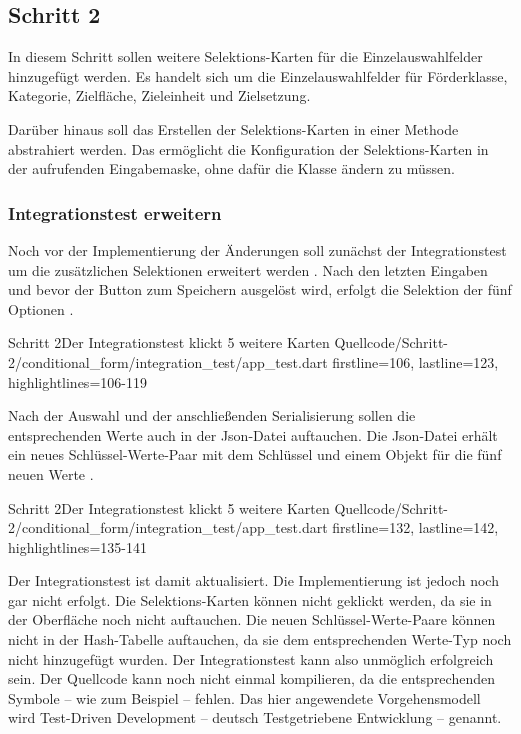 \clearpage 

\subsection{Schritt 2}

In diesem Schritt sollen weitere Selektions-Karten für die Einzelauswahlfelder hinzugefügt werden.
Es handelt sich um die Einzelauswahlfelder für Förderklasse, Kategorie, Zielfläche, Zieleinheit und Zielsetzung. 

Darüber hinaus soll das Erstellen der Selektions-Karten in einer Methode abstrahiert werden.
Das ermöglicht die Konfiguration der Selektions-Karten in der aufrufenden Eingabemaske, ohne dafür die Klasse  ändern zu müssen.

\subsubsection{Integrationstest erweitern}

Noch vor der Implementierung der Änderungen soll zunächst der Integrationstest um die zusätzlichen Selektionen erweitert werden \Lst{\ref{lst:Schritt2IntegrationstestKlickt5WeitereKarten}}. Nach den letzten Eingaben und bevor der Button zum Speichern ausgelöst wird, erfolgt die Selektion der fünf Optionen .   

\begin{alexlisting}{Schritt 2}{Der Integrationstest klickt 5 weitere Karten}
  {Quellcode/Schritt-2/conditional_form/integration_test/app_test.dart}
  {firstline=106, lastline=123, highlightlines={106-119}}
  \label{lst:Schritt2IntegrationstestKlickt5WeitereKarten}
\end{alexlisting}

Nach der Auswahl und der anschließenden Serialisierung sollen die entsprechenden Werte auch in der Json-Datei auftauchen.
Die Json-Datei erhält ein neues Schlüssel-Werte-Paar mit dem Schlüssel  und einem Objekt für die fünf neuen Werte .

\begin{alexlisting}{Schritt 2}{Der Integrationstest klickt 5 weitere Karten}
  {Quellcode/Schritt-2/conditional_form/integration_test/app_test.dart}
  {firstline=132, lastline=142, highlightlines={135-141}}
  \label{lst:Schritt2ExpectedJson}
\end{alexlisting}

Der Integrationstest ist damit aktualisiert.
Die Implementierung ist jedoch noch gar nicht erfolgt.
Die Selektions-Karten können nicht geklickt werden, da sie in der Oberfläche noch nicht auftauchen.
Die neuen Schlüssel-Werte-Paare können nicht in der Hash-Tabelle auftauchen, da sie dem entsprechenden Werte-Typ noch nicht hinzugefügt wurden.
Der Integrationstest kann also unmöglich erfolgreich sein.
Der Quellcode kann noch nicht einmal kompilieren, da die entsprechenden Symbole -- wie zum Beispiel  -- fehlen.
Das hier angewendete Vorgehensmodell wird Test-Driven Development -- deutsch Testgetriebene Entwicklung -- genannt.
 


